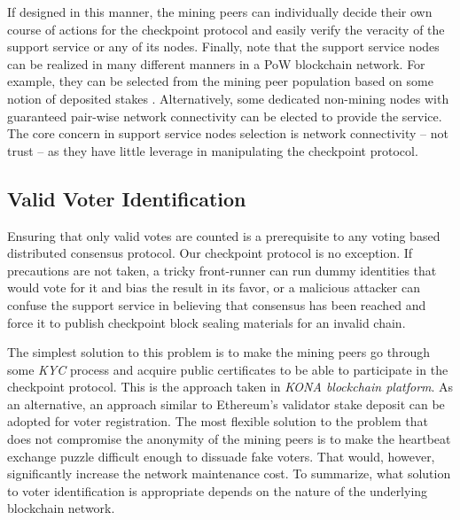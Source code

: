 If designed in this manner, the mining peers can individually decide their own course of actions for the checkpoint protocol and easily verify the veracity of the support service or any of its nodes. Finally, note that the support service nodes can be realized in many different manners in a PoW blockchain network. For example, they can be selected from the mining peer population based on some notion of deposited stakes \cite{casper-gadget}. Alternatively, some dedicated non-mining nodes with guaranteed pair-wise network connectivity can be elected to provide the service. The core concern in support service nodes selection is network connectivity -- not trust -- as they have little leverage in manipulating the checkpoint protocol.
   
\subsection{Valid Voter Identification}
Ensuring that only valid votes are counted is a prerequisite to any voting based distributed consensus protocol. Our checkpoint protocol is no exception. If precautions are not taken, a tricky front-runner can run dummy identities that would vote for it and bias the result in its favor, or a malicious attacker can confuse the support service in believing that consensus has been reached and force it to publish checkpoint block sealing materials for an invalid chain.

The simplest solution to this problem is to make the mining peers go through some \textit{KYC} process and acquire public certificates to be able to participate in the checkpoint protocol. This is the approach taken in \textit{KONA blockchain platform}. As an alternative, an approach similar to Ethereum's validator stake deposit \cite{casper} can be adopted for voter registration. The most flexible solution to the problem that does not compromise the anonymity of the mining peers is to make the heartbeat exchange puzzle difficult enough to dissuade fake voters. That would, however, significantly increase the network maintenance cost. To summarize, what solution to voter identification is appropriate depends on the nature of the underlying blockchain network.       

